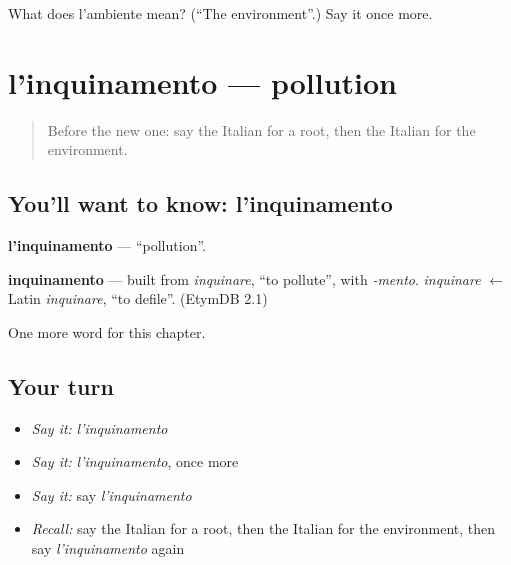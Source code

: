 \begin{tcolorbox}[breakable,colback=teal!4,colframe=teal!35!black,title={Before you move on}]
What does l'ambiente mean? (\textquotedblleft{}The environment\textquotedblright{}.) Say it once more.
\end{tcolorbox}
\section[l'inquinamento]{l'inquinamento — pollution}

\label{lesson:IT-C169-inquinamento}



\begin{quote}
Before the new one: say the Italian for a root, then the Italian for the environment.
\end{quote}

\subsection*{You'll want to know: l'inquinamento}
\textbf{l'inquinamento} — \textquotedblleft{}pollution\textquotedblright{}.

\begin{cousinweb}
\textbf{inquinamento} — built from \emph{inquinare}, \textquotedblleft{}to pollute\textquotedblright{}, with \emph{-mento}. \emph{inquinare} $\leftarrow$ Latin \emph{inquinare}, \textquotedblleft{}to defile\textquotedblright{}. (EtymDB 2.1)
\end{cousinweb}

\begin{grammarlens}[title={What you've built}]
One more word for this chapter.
\end{grammarlens}

\subsection*{Your turn}
\begin{itemize}
\raggedright
  \item \emph{Say it:} \emph{l'inquinamento}
  \item \emph{Say it:} \emph{l'inquinamento}, once more
  \item \emph{Say it:} say \emph{l'inquinamento}
  \item \emph{Recall:} say the Italian for a root, then the Italian for the environment, then say \emph{l'inquinamento} again
\end{itemize}

